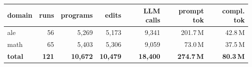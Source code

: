 \begin{tabular}{lrrrrrr}
\toprule
domain & runs & programs & edits & LLM calls & prompt tok & compl. tok \\
\midrule
ale & 56 & 5{,}269 & 5{,}173 & 9{,}341 & 201.7\,M & 42.8\,M \\
math & 65 & 5{,}403 & 5{,}306 & 9{,}059 & 73.0\,M & 37.5\,M \\
\midrule
\textbf{total} & \textbf{121} & \textbf{10{,}672} & \textbf{10{,}479} & \textbf{18{,}400} & \textbf{274.7\,M} & \textbf{80.3\,M} \\
\bottomrule
\end{tabular}
